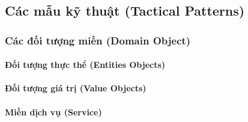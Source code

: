 \documentclass{article} %
\begin{document}
\subsection{Các mẫu kỹ thuật (Tactical Patterns)}

% 

\subsubsection{Các đối tượng miền (Domain Object)}

% 

\paragraph{Đối tượng thực thể (Entities Objects)}

% 

\paragraph{Đối tượng giá trị (Value Objects)}

% 

\paragraph{Miền dịch vụ (Service)}

% 




% 
\end{document}
